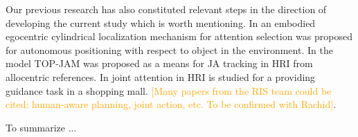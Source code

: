 \documentclass[letterpaper, 10 pt, conference]{ieeeconf}  %
\begin{document}
	Our previous research has also constituted relevant steps in the direction of developing the current study which is worth mentioning. In \cite{chame2016} an embodied egocentric cylindrical localization mechanism for attention selection was proposed for autonomous positioning with respect to object in the environment. In \cite{chame2023top} the model TOP-JAM was proposed as a means for JA tracking in HRI from allocentric references. In \cite{heikkila2019} joint attention in HRI is studied for a providing guidance task in a shopping mall. \textcolor{orange}{[Many papers from the RIS team could be cited: human-aware planning, joint action, etc. To be confirmed with Rachid]}.
	 
	To summarize ...
	
	
	
	
	
	
	
	
	
	
	
	
	
	 
	
\end{document}
